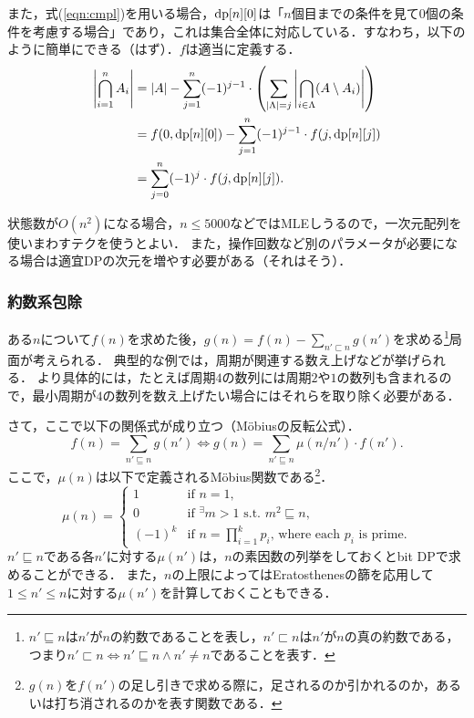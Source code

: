 \documentclass{jsarticle}
\newcommand{\DP}{\ensuremath\mathrm{dp}}
\begin{document}
また，式(\ref{eqn:cmpl})を用いる場合，$\DP[n][0]$は「$n$個目までの条件を見て$0$個の条件を考慮する場合」であり，これは集合全体に対応している．すなわち，以下のように簡単にできる（はず）．$f$は適当に定義する．
\begin{align*}
  \left|\bigcap_{i=1}^n A_i\right|
  &= |A| - \sum_{j=1}^n (-1)^{j-1}\cdot \left(\sum_{|\Lambda|=j} \left|\bigcap_{i\in\Lambda} (A\setminus A_i)\right|\right)\\
  &= f(0, \DP[n][0]) - \sum_{j=1}^n (-1)^{j-1}\cdot f(j, \DP[n][j])\\
  &= \sum_{j=0}^n (-1)^j\cdot f(j, \DP[n][j]).
\end{align*}

状態数が$O(n^2)$になる場合，$n\le 5000$などではMLEしうるので，一次元配列を使いまわすテクを使うとよい．
また，操作回数など別のパラメータが必要になる場合は適宜DPの次元を増やす必要がある（それはそう）．

\subsubsection{約数系包除}
ある$n$について$f(n)$を求めた後，$g(n) = f(n) - \sum_{n'\sqsubset n} g(n')$を求める\footnote{$n'\sqsubseteq n$は$n'$が$n$の約数であることを表し，$n'\sqsubset n$は$n'$が$n$の真の約数である，つまり$n'\sqsubset n\iff n'\sqsubseteq n\wedge n'\neq n$であることを表す．}局面が考えられる．
典型的な例では，周期が関連する数え上げなどが挙げられる．
より具体的には，たとえば周期$4$の数列には周期$2$や$1$の数列も含まれるので，最小周期が$4$の数列を数え上げたい場合にはそれらを取り除く必要がある．

さて，ここで以下の関係式が成り立つ（M\"obiusの反転公式）．
\[f(n) = \sum_{n'\sqsubseteq n} g(n') \iff g(n) = \sum_{n'\sqsubseteq n} \mu(n/n')\cdot f(n').\]
ここで，$\mu(n)$は以下で定義されるM\"obius関数である\footnote{$g(n)$を$f(n')$の足し引きで求める際に，足されるのか引かれるのか，あるいは打ち消されるのかを表す関数である．}．
\[
\mu(n) = \begin{cases}
  1 & \text{if }n = 1,\\
  0 & \text{if }{}^\exists m > 1\text{ s.t. }m^2\sqsubseteq n,\\
  (-1)^k & \text{if }n = \prod_{i=1}^k p_i\text{, where each }p_i\text{ is prime}.
\end{cases}
\]
$n'\sqsubseteq n$である各$n'$に対する$\mu(n')$は，$n$の素因数の列挙をしておくとbit DPで求めることができる．
また，$n$の上限によってはEratosthenesの篩を応用して$1\le n'\le n$に対する$\mu(n')$を計算しておくこともできる．
\end{document}
